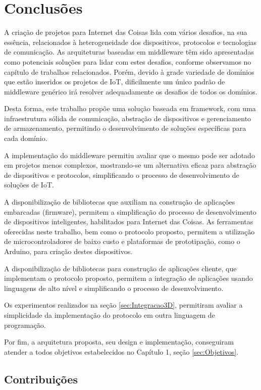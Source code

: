 
\chapter{Conclusões}

A criação de projetos para Internet das Coisas lida com vários desafios,
na sua essência, relacionados à heterogeneidade dos dispositivos,
protocolos e tecnologias de comunicação. As arquiteturas baseadas
em middleware têm sido apresentadas como potenciais soluções para
lidar com estes desafios, conforme observamos no capítulo de trabalhos
relacionados. Porém, devido à grade variedade de domínios que estão
inseridos os projetos de IoT, dificilmente um único padrão de middleware
genérico irá resolver adequadamente os desafios de todos os domínios. 

Desta forma, este trabalho propõe uma solução baseada em framework,
com uma infraestrutura sólida de comunicação, abstração de dispositivos
e gerenciamento de armazenamento, permitindo o desenvolvimento de
soluções específicas para cada domínio.

A implementação do middleware permitiu avaliar que o mesmo pode ser
adotado em projetos menos complexos, mostrando-se um alternativa eficaz
para abstração de dispositivos e protocolos, simplificando o processo
de desenvolvimento de soluções de IoT.

A disponibilização de bibliotecas que auxiliam na construção de aplicações
embarcadas (firmware), permitem a simplificação do processo de desenvolvimento
de dispositivos inteligentes, habilitados para Internet das Coisas.
As ferramentas oferecidas neste trabalho, bem como o protocolo proposto,
permitem a utilização de microcontroladores de baixo custo e plataformas
de prototipação, como o Arduino, para criação destes dispositivos.

A disponibilização de bibliotecas para construção de aplicações cliente,
que implementam o protocolo proposto, permitem a integração de aplicações
usando linguagens de alto nível e simplificando o processo de desenvolvimento. 

Os experimentos realizados na seção \ref{sec:Integracao3D}, permitiram
avaliar a simplicidade da implementação do protocolo em outra linguagem
de programação.

Por fim, a arquitetura proposta, seu design e implementação, conseguiram
atender a todos objetivos estabelecidos no Capítulo 1, seção \ref{sec:Objetivos}. 


\section{Contribuições}

